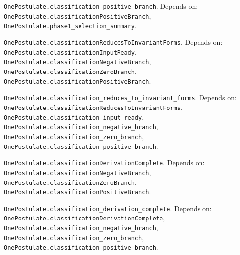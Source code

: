 \begin{lemma}\label{OnePostulate.classification_positive_branch}
\texttt{OnePostulate.classification\_positive\_branch}. Depends on: \texttt{OnePostulate.classificationPositiveBranch}, \texttt{OnePostulate.phase1\_selection\_summary}.
\end{lemma}

\begin{definition}\label{OnePostulate.classificationReducesToInvariantForms}
\texttt{OnePostulate.classificationReducesToInvariantForms}. Depends on: \texttt{OnePostulate.classificationInputReady}, \texttt{OnePostulate.classificationNegativeBranch}, \texttt{OnePostulate.classificationZeroBranch}, \texttt{OnePostulate.classificationPositiveBranch}.
\end{definition}

\begin{lemma}\label{OnePostulate.classification_reduces_to_invariant_forms}
\texttt{OnePostulate.classification\_reduces\_to\_invariant\_forms}. Depends on: \texttt{OnePostulate.classificationReducesToInvariantForms}, \texttt{OnePostulate.classification\_input\_ready}, \texttt{OnePostulate.classification\_negative\_branch}, \texttt{OnePostulate.classification\_zero\_branch}, \texttt{OnePostulate.classification\_positive\_branch}.
\end{lemma}

\begin{definition}\label{OnePostulate.classificationDerivationComplete}
\texttt{OnePostulate.classificationDerivationComplete}. Depends on: \texttt{OnePostulate.classificationNegativeBranch}, \texttt{OnePostulate.classificationZeroBranch}, \texttt{OnePostulate.classificationPositiveBranch}.
\end{definition}

\begin{lemma}\label{OnePostulate.classification_derivation_complete}
\texttt{OnePostulate.classification\_derivation\_complete}. Depends on: \texttt{OnePostulate.classificationDerivationComplete}, \texttt{OnePostulate.classification\_negative\_branch}, \texttt{OnePostulate.classification\_zero\_branch}, \texttt{OnePostulate.classification\_positive\_branch}.
\end{lemma}
